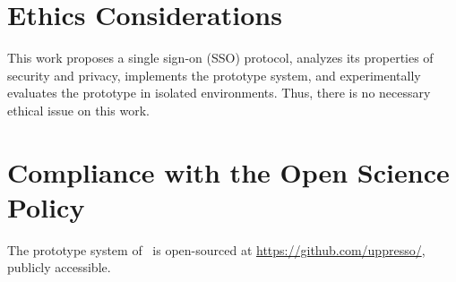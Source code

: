 \section*{Ethics Considerations}
This work proposes a single sign-on (SSO) protocol, analyzes its properties of security and privacy,
    implements the prototype system,
    and experimentally evaluates the prototype in isolated environments.
Thus, there is no necessary ethical issue on this work.

\section*{Compliance with the Open Science Policy}
The prototype system of \usso\ is open-sourced at \url{https://github.com/uppresso/}, publicly accessible. 